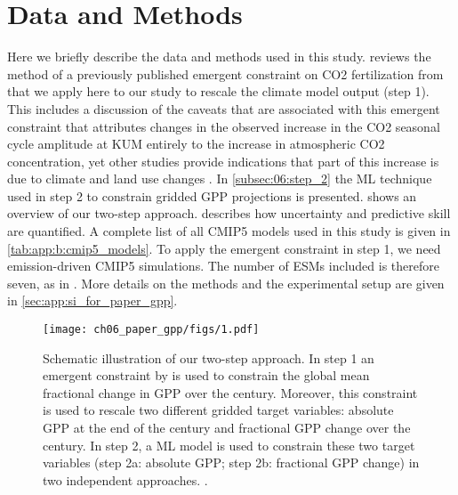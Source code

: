 \section{Data and Methods}
\label{sec:06:data_and_methods}

Here we briefly describe the data and methods used in this study.
 reviews the method of a previously published emergent
constraint on \ac{CO2} fertilization from \textcite{Wenzel2016} that we apply
here to our study to rescale the climate model output (step 1). This includes a
discussion of the caveats that are associated with this emergent constraint
that attributes changes in the observed increase in the \ac{CO2} seasonal cycle
amplitude at \ac{KUM} entirely to the increase in atmospheric \ac{CO2}
concentration, yet other studies provide indications that part of this increase
is due to climate and land use changes \autocite{Bastos2019, Forkel2016,
  Piao2018, Zhao2016}. In \cref{subsec:06:step_2} the \ac{ML} technique used in
step 2 to constrain gridded \ac{GPP} projections is presented.
 shows an overview of our two-step approach.
 describes how uncertainty and predictive
skill are quantified. A complete list of all \acs{CMIP}5 models used in this
study is given in \cref{tab:app:b:cmip5_models}. To apply the emergent
constraint in step 1, we need emission-driven \acs{CMIP}5 simulations. The
number of \acp{ESM} included is therefore seven, as in \textcite{Wenzel2016}.
More details on the methods and the experimental setup are given in
\cref{sec:app:si_for_paper_gpp}.

\begin{figure}[t]
  \centering
  \texttt{[image: ch06\_paper\_gpp/figs/1.pdf]}
  \caption[
    Schematic illustration of our two-step approach.
  ]{
    Schematic illustration of our two-step approach. In step 1 an emergent
    constraint by \textcite{Wenzel2016} is used to constrain the global mean
    fractional change in \acf{GPP} over the  century. Moreover, this
    constraint is used to rescale two different gridded target variables:
    absolute \acs{GPP} at the end of the  century and fractional
    \acs{GPP} change over the  century. In step 2, a \acl{ML} model is
    used to constrain these two target variables (step 2a: absolute \acs{GPP};
    step 2b: fractional \acs{GPP} change) in two independent approaches.
    .
  }
  \label{fig:06:schematic_steps}
\end{figure}


